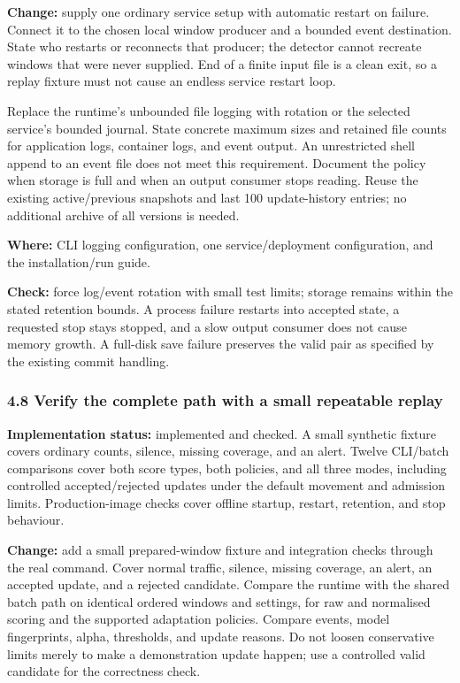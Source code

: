 \documentclass[11pt,a4paper]{article}
\begin{document}
\textbf{Change:} supply one ordinary service setup with automatic restart on
failure. Connect it to the chosen local window producer and a bounded event
destination. State who restarts or reconnects that producer; the detector cannot
recreate windows that were never supplied. End of a finite input file is a clean
exit, so a replay fixture must not cause an endless service restart loop.

Replace the runtime's unbounded file logging with rotation or the selected
service's bounded journal. State concrete maximum sizes and retained file counts
for application logs, container logs, and event output. An unrestricted shell
append to an event file does not meet this requirement. Document the policy
when storage is full and when an output consumer stops reading. Reuse the
existing active/previous snapshots and last 100 update-history entries; no
additional archive of all versions is needed.

\textbf{Where:} CLI logging configuration, one service/deployment configuration,
and the installation/run guide.

\textbf{Check:} force log/event rotation with small test limits; storage remains
within the stated retention bounds. A process failure restarts into accepted
state, a requested stop stays stopped, and a slow output consumer does not cause
memory growth. A full-disk save failure preserves the valid pair as specified
by the existing commit handling.

\subsubsection*{4.8 Verify the complete path with a small repeatable replay}

\textbf{Implementation status:} implemented and checked. A small synthetic
fixture covers ordinary counts, silence, missing coverage, and an alert. Twelve
CLI/batch comparisons cover both score types, both policies, and all three modes,
including controlled accepted/rejected updates under the default movement and
admission limits. Production-image checks cover offline startup, restart,
retention, and stop behaviour.

\textbf{Change:} add a small prepared-window fixture and integration checks
through the real command. Cover normal traffic, silence, missing coverage, an
alert, an accepted update, and a rejected candidate. Compare the runtime with
the shared batch path on identical ordered windows and settings, for raw and
normalised scoring and the supported adaptation policies. Compare events,
model fingerprints, alpha, thresholds, and update reasons. Do not loosen
conservative limits merely to make a demonstration update happen; use a
controlled valid candidate for the correctness check.
\end{document}
